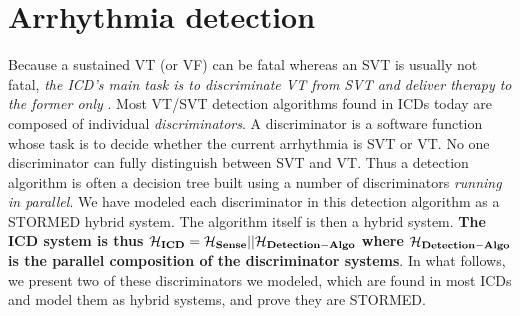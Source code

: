 \section{Arrhythmia detection}
\label{sec:discriminators}
Because a sustained \ac{VT} (or \ac{VF}) can be fatal whereas an \ac{SVT} is usually not fatal, 
\emph{the ICD's main task is to discriminate \ac{VT} from \ac{SVT} and deliver therapy to the former only} \cite{compass}.
Most \ac{VT}/\ac{SVT} detection algorithms found in ICDs today are composed of individual \emph{discriminators}. 
A discriminator is a software function whose task is to decide whether the current arrhythmia is \ac{SVT} or \ac{VT}.
No one discriminator can fully distinguish between SVT and VT.
Thus a detection algorithm is often a decision tree built using a number of discriminators \emph{running in parallel}.
We have modeled each discriminator in this detection algorithm as a STORMED hybrid system.
The algorithm itself is then a hybrid system.
\textbf{The ICD system is thus 
$\mathbf{\mathcal{H}_{ICD} = \mathcal{H}_{Sense}||\mathcal{H}_{Detection-Algo}}$ where $\mathbf{\mathcal{H}_{Detection-Algo}}$ is the parallel composition of the discriminator systems}.
In what follows, we present two of these discriminators we modeled, which are found in most ICDs and model them as hybrid systems, and prove they are STORMED.







